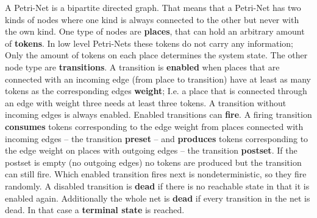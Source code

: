 A Petri-Net is a bipartite directed graph.
That means that a Petri-Net has two kinds of nodes where one kind is always connected to the other but never with the own kind.
One type of nodes are \textbf{places}, that can hold an arbitrary amount of \textbf{tokens}.
In low level Petri-Nets these tokens do not carry any information; 
Only the amount of tokens on each place determines the system state.
The other node type are \textbf{transitions}.
A transition is \textbf{enabled} when places that are connected with an incoming edge (from place to transition) have at least as many tokens as the corresponding edges \textbf{weight};
I.e. a place that is connected through an edge with weight three needs at least three tokens.
A transition without incoming edges is always enabled.
Enabled transitions can \textbf{fire}.
A firing transition \textbf{consumes} tokens corresponding to the edge weight from places connected with incoming edges -- the transition \textbf{preset} -- and \textbf{produces} tokens corresponding to the edge weight on places with outgoing edges -- the transition \textbf{postset}.
If the postset is empty (no outgoing edges) no tokens are produced but the transition can still fire.
Which enabled transition fires next is nondeterministic, so they fire randomly.
A disabled transition is \textbf{dead} if there is no reachable state in that it is enabled again.
Additionally the whole net is \textbf{dead} if every transition in the net is dead.
In that case a \textbf{terminal state} is reached.

